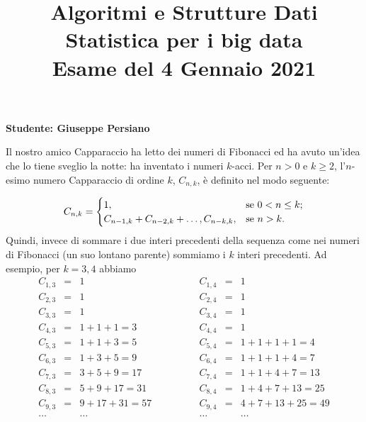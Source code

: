 \documentclass{amsart}
\begin{document}
\title{Algoritmi e Strutture Dati\\
Statistica per i big data\\
Esame del 4 Gennaio 2021
}


\newcommand{\NomeStudente}{Giuseppe Persiano}
\newcommand{\nomeClasse}{{\tt{Sol}}}
\newcommand{\nomeMetodo}{{\tt{maxK}}}
\newcommand{\oraconsegna}{11}
\newcommand{\dataoggi}{4 Gennaio, 2021}


\maketitle

\hfill{{\bf Studente: \NomeStudente}}

\smallskip
Il nostro amico Capparaccio ha letto dei numeri di Fibonacci ed ha avuto un'idea
che lo tiene sveglio la notte: ha inventato i numeri $k$-acci.
Per $n>0$ e $k\geq 2$, l'$n$-esimo numero Capparaccio di ordine $k$,
$C_{n,k}$, \`e definito nel modo seguente:

$$C_{n,k}=\begin{cases}
        1, & \text{se } 0<n\leq k;\cr
        C_{n-1,k}+C_{n-2,k}+\ldots,C_{n-k,k}, & \text{se } n>k.\cr
\end{cases}
$$
Quindi, invece di sommare i due interi precedenti della sequenza come
nei numeri di Fibonacci (un suo lontano parente) sommiamo i $k$ interi
precedenti.
Ad esempio, per $k=3,4$ abbiamo
$$
\begin{array}{rcl}
C_{1,3}&=&1\\
C_{2,3}&=&1\\
C_{3,3}&=&1\\
C_{4,3}&=&1+1+1=3\\
C_{5,3}&=&1+1+3=5\\
C_{6,3}&=&1+3+5=9\\
C_{7,3}&=&3+5+9=17\\
C_{8,3}&=&5+9+17=31\\
C_{9,3}&=&9+17+31=57\\
\ldots& &\ldots
\end{array}
\qquad
\qquad
\begin{array}{rcl}
C_{1,4}&=&1\\
C_{2,4}&=&1\\
C_{3,4}&=&1\\
C_{4,4}&=&1\\
C_{5,4}&=&1+1+1+1=4\\
C_{6,4}&=&1+1+1+4=7\\
C_{7,4}&=&1+1+4+7=13\\
C_{8,4}&=&1+4+7+13=25\\
C_{9,4}&=&4+7+13+25=49\\
\ldots& &\ldots
\end{array}
$$
\end{document}
